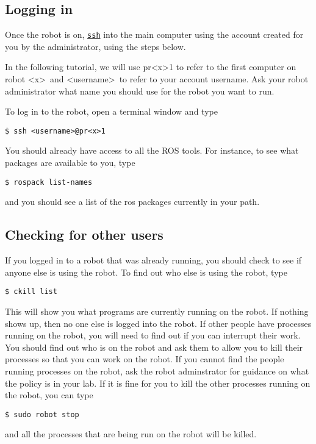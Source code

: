 \subsection{Logging in}
Once the robot is on, \texttt{\href{http://unixhelp.ed.ac.uk/CGI/man-cgi?ssh}{ssh}} into the main computer using the account 
created for you by the administrator, using the steps below.

In the following tutorial, we will use pr\textless x\textgreater 1 to refer to the first computer on robot \textless x\textgreater\ and \textless username\textgreater\ to refer to your account username.
Ask your robot  administrator what name you should use for the robot you want to run. 

To log in to the robot, open a terminal window and type
\begin{verbatim}
$ ssh <username>@pr<x>1
\end{verbatim}
You should already have access to all the ROS tools. For instance, to see what packages are available to you, type
\begin{verbatim}
$ rospack list-names
\end{verbatim}
and you should see a list of the ros packages currently in your path.

\subsection{Checking for other users}
If you logged in to a robot that was already running, you should check to see if anyone else is using the robot. To 
find out who else is using the robot, type
\begin{verbatim}
$ ckill list
\end{verbatim}
This will show you what programs are currently running on the robot.  If nothing shows up, then no one else is logged into the robot. If other people have processes running on the 
robot, you will need to find out if you can interrupt their work. You should find out who is on the robot and ask them 
to allow you to kill their processes so that you can work on the robot.  If you cannot find the people running processes 
on the robot, ask the robot adminstrator for guidance on what the policy is in your lab. If it is fine for you to kill 
the other processes running on the robot, you can type
\begin{verbatim}
$ sudo robot stop
\end{verbatim}
and all the processes that are being run on the robot will be killed.

